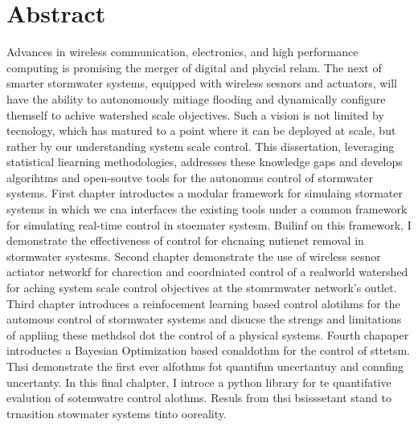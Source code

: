 \begingroup
\let\clearpage\relax
\let\cleardoublepage\relax
\let\cleardoublepage\relax

\chapter*{Abstract}
Advances in wireless communication, electronics, and high performance computing is promising the merger of digital and phycisl relam.
The next of smarter stormwater systems, equipped with wireless sesnors and actuators, will have the ability to autonomously mitiage flooding and dynamically configure themself to achive watershed scale objectives.
Such a vision is not limited by tecnology, which has matured to a point where it can be deployed at scale, but rather by our understanding system scale control.
This dissertation, leveraging statistical liearning methodologies, addresses these knowledge gaps and develops algorihtms and open-soutve tools for the autonomus control of stormwater systems.
First chapter introductes a modular framework for simulaing stormater systems in which we cna interfaces the existing tools under a common framework for simulating real-time control in stoemater systesm.
Builinf on this framework, I demonstrate the effectiveness of control for ehcnaing nutienet removal in stormwater systesms.
Second chapter demonstrate the use of wireless sesnor actiator networkf for charection and coordniated control of a realworld watershed for aching system scale control objectives at the stomrmwater network's outlet.
Third chapter introduces a reinfocement learning based control alotihms for the automous control of stormwater systems and disucse the strengs and limitations of appliing these methdsol dot the control of a physical systems.
Fourth chapaper introductes a Bayesian Optimization based conaldothm for the control of sttetsm. 
Thsi demonstrate the first ever alfothms fot quantifun uncertantuy and connfing uncertanty.
In this final chalpter, I introce a python library for te quantifative evalution of sotemwatre control alothms.
Resuls from thsi bsisssetant stand to trnasition stowmater systems tinto ooreality.

\endgroup

\vfill
